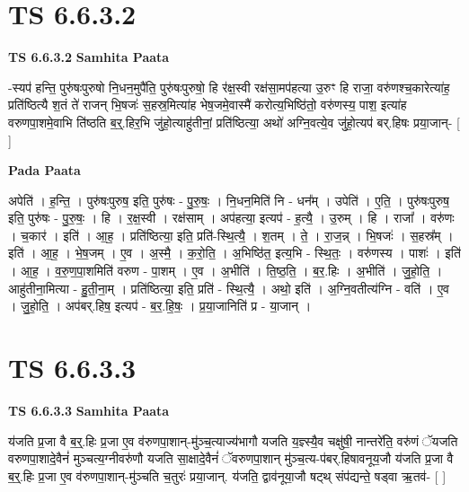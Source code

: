 \documentclass[17pt]{extarticle}
\begin{document}

\section{ TS 6.6.3.2 }

\textbf{TS 6.6.3.2 } \newline
\textbf{Samhita Paata} \newline

-स्यप॑ हन्ति॒ पुरु॑षःपुरुषो नि॒धन॒मुपै॑ति॒ पुरु॑षःपुरुषो॒ हि र॑क्ष॒स्वी रक्ष॑सा॒मप॑हत्या उ॒रुꣳ हि राजा॒ वरु॑णश्च॒कारेत्या॑ह॒ प्रति॑ष्ठित्यै श॒तं ते॑ राजन् भि॒षजः॑ स॒हस्र॒मित्या॑ह भेष॒जमे॒वास्मै॑ करोत्य॒भिष्ठि॑तो॒ वरु॑णस्य॒ पाश॒ इत्या॑ह वरुणपा॒शमे॒वाभि ति॑ष्ठति ब॒र्॒.हिर॒भि जु॑हो॒त्याहु॑तीनां॒ प्रति॑ष्ठित्या॒ अथो॑ अग्नि॒वत्ये॒व जु॑हो॒त्यप॑ बर्.हिषः प्रया॒जान्- [  ] \newline

\textbf{Pada Paata} \newline

अपेति॑ । ह॒न्ति॒ । पुरु॑षःपुरुष॒ इति॒ पुरु॑षः - पु॒रु॒षः॒ । नि॒धन॒मिति॑ नि - धन᳚म् । उपेति॑ । ए॒ति॒ । पुरु॑षःपुरुष॒ इति॒ पुरु॑षः - पु॒रु॒षः॒ । हि । र॒क्ष॒स्वी । रक्ष॑साम् । अप॑हत्या॒ इत्यप॑ - ह॒त्यै॒ । उ॒रुम् । हि । राजा᳚ । वरु॑णः । च॒कार॑ । इति॑ । आ॒ह॒ । प्रति॑ष्ठित्या॒ इति॒ प्रति॑-स्थि॒त्यै॒ । श॒तम् । ते॒ । रा॒ज॒न्न् । भि॒षजः॑ । स॒हस्र᳚म् । इति॑ । आ॒ह॒ । भे॒ष॒जम् । ए॒व । अ॒स्मै॒ । क॒रो॒ति॒ । अ॒भिष्ठि॑त॒ इत्य॒भि - स्थि॒तः॒ । वरु॑णस्य । पाशः॑ । इति॑ । आ॒ह॒ । व॒रु॒ण॒पा॒शमिति॑ वरुण - पा॒शम् । ए॒व । अ॒भीति॑ । ति॒ष्ठ॒ति॒ । ब॒र॒.हिः । अ॒भीति॑ । जु॒हो॒ति॒ । आहु॑तीना॒मित्या - हु॒ती॒ना॒म् । प्रति॑ष्ठित्या॒ इति॒ प्रति॑ - स्थि॒त्यै॒ । अथो॒ इति॑ । अ॒ग्नि॒वतीत्य॑ग्नि - वति॑ । ए॒व । जु॒हो॒ति॒ । अप॑बर्.हिष॒ इत्यप॑ - ब॒र॒.हि॒षः॒ । प्र॒या॒जानिति॑ प्र - या॒जान् ।  \newline





\section{ TS 6.6.3.3 }

\textbf{TS 6.6.3.3 } \newline
\textbf{Samhita Paata} \newline

य॑जति प्र॒जा वै ब॒र्॒.हिः प्र॒जा ए॒व व॑रुणपा॒शान्-मु॑ञ्च॒त्याज्य॑भागौ यजति य॒ज्ञ्स्यै॒व चक्षु॑षी॒ नान्तरे॑ति॒ वरु॑णं ॅयजति वरुणपा॒शादे॒वैनं॑ मुञ्चत्य॒ग्नीवरु॑णौ यजति सा॒क्षादे॒वैनं॑ ॅवरुणपा॒शान् मु॑ञ्च॒त्य-प॑बर्.हिषावनूय॒जौ य॑जति प्र॒जा वै ब॒र्॒.हिः प्र॒जा ए॒व व॑रुणपा॒शान्-मु॑ञ्चति च॒तुरः॑ प्रया॒जान्. य॑जति॒ द्वाव॑नूया॒जौ षट्थ् संप॑द्यन्ते॒ षड्वा ऋ॒तव॑- [  ] \newline
\end{document}
